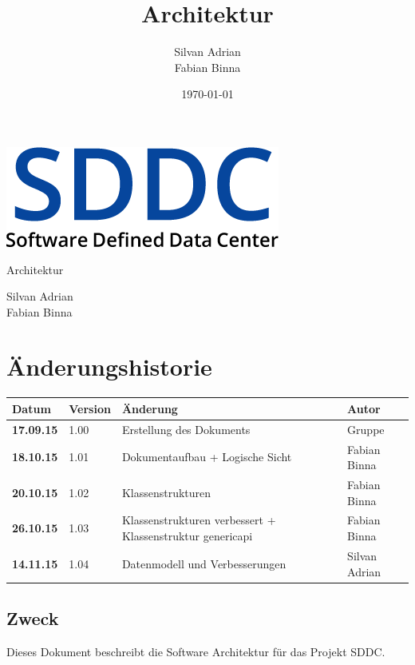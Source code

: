 \documentclass[11pt]{scrartcl}
\title{Architektur}
\author{Silvan Adrian \\ Fabian Binna}
\date{\today{}}
\begin{document}
\def\arraystretch{1.5}
\begin{titlepage}
\begin{center}
\vspace{10em}
\includegraphics[scale=2]{SDDC}
\vspace{10em}
\end{center}
\begin{center}
\huge {Architektur}
\end{center}
\begin{center}
\vspace{10em}
\LARGE {Silvan Adrian} \\
\LARGE {Fabian Binna}
\end{center}

\end{titlepage}

\newpage
\section{Änderungshistorie}
\begin{tabularx}{\linewidth}{l l X l}
\textbf{Datum} & \textbf{Version} & \textbf{Änderung}  & \textbf{Autor} \\
\hline
\textbf{17.09.15} & 1.00 & Erstellung des Dokuments & Gruppe \\
\textbf{18.10.15} & 1.01 & Dokumentaufbau + Logische Sicht & Fabian Binna\\
\textbf{20.10.15} & 1.02 & Klassenstrukturen & Fabian Binna\\
\textbf{26.10.15} & 1.03 & Klassenstrukturen verbessert + Klassenstruktur genericapi & Fabian Binna\\
\textbf{14.11.15} & 1.04 & Datenmodell und Verbesserungen & Silvan Adrian\\

\end{tabularx}

\newpage
\tableofcontents
\newpage

\subsection{Zweck}
Dieses Dokument beschreibt die Software Architektur für das Projekt SDDC.
\end{document}
